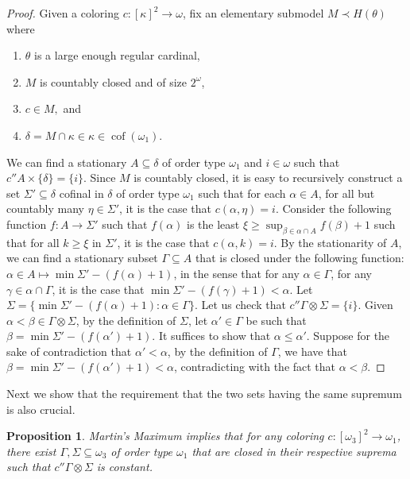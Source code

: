 \documentclass[12pt]{amsart}
\theoremstyle{definition}
\theoremstyle{plain}
\theoremstyle{plain}
\newtheorem{proposition}[definition]{Proposition}
\DeclareMathOperator{\cof}{cof}
\begin{document}
\begin{proof}
Given a coloring $c: [\kappa]^2\to \omega$, fix an elementary submodel $M\prec H(\theta)$ where
	\begin{enumerate}
	\item $\theta$ is a large enough regular cardinal,
	\item $M$ is countably closed and of size $2^\omega$, 
	\item $c\in M,$ and
	\item $\delta=M\cap \kappa\in \kappa\in \cof(\omega_1).$
	\end{enumerate}
 We can find a stationary $A\subseteq \delta$ of order type $\omega_1$ and $i\in \omega$ such that $c'' A\times \{\delta\}=\{i\}$. Since $M$ is countably closed, it is easy to recursively construct a set $\Sigma'\subseteq \delta$ cofinal in $\delta$ of order type $\omega_1$ such that for each $\alpha\in A$, for all but countably many $\eta\in \Sigma'$, it is the case that $c(\alpha,\eta)=i$. Consider the following function $f: A\to \Sigma'$ such that $f(\alpha)$ is the least $\xi \geq \sup_{\beta\in \alpha \cap A}f(\beta)+1$ such that for all $k\geq \xi$ in $\Sigma'$, it is the case that $c(\alpha,k)=i$. By the stationarity of $A$, we can find a stationary subset $\Gamma\subseteq A$ that is closed under the following function: $\alpha\in A\mapsto \min \Sigma'-(f(\alpha)+1)$, in the sense that for any $\alpha\in \Gamma$, for any $\gamma\in \alpha\cap \Gamma$, it is the case that $\min\Sigma'-(f(\gamma)+1)<\alpha$. Let $\Sigma=\{\min \Sigma' - (f(\alpha)+1): \alpha\in \Gamma\}$. Let us check that $c'' \Gamma\otimes \Sigma = \{i\}$. Given $\alpha<\beta\in \Gamma\otimes \Sigma$, by the definition of $\Sigma$, let $\alpha'\in \Gamma$ be such that $\beta=\min \Sigma' - (f(\alpha')+1)$. It suffices to show that $\alpha\leq \alpha'$. Suppose for the sake of contradiction that $\alpha'<\alpha$, by the definition of $\Gamma$, we have that $\beta=\min\Sigma'-(f(\alpha')+1)<\alpha$, contradicting with the fact that $\alpha<\beta$.\end{proof}


Next we show that the requirement that the two sets having the same supremum is also crucial.


\begin{proposition}\label{prop: MM}
Martin's Maximum implies that for any coloring  $c: [\omega_3]^2\to \omega_1$, there exist $\Gamma, \Sigma\subseteq \omega_3$ of order type $\omega_1$ that are closed in their respective suprema such that $c'' \Gamma \otimes \Sigma$ is constant.
\end{proposition}
\end{document}
